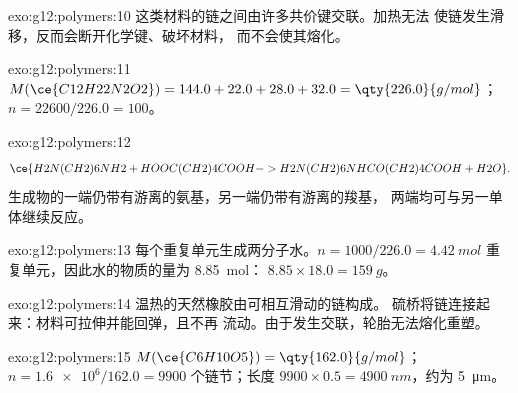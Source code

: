 \begin{solution}{exo:g12:polymers:10}
这类材料的链之间由许多共价键交联。加热无法
使链发生滑移，反而会断开化学键、破坏材料，
而不会使其熔化。
\end{solution}

\begin{solution}{exo:g12:polymers:11}
$M(\ce{C12H22N2O2}) = 144.0 + 22.0 + 28.0 + 32.0 = \qty{226.0}{g/mol}$；
$n = 22600/226.0 = 100$。
\end{solution}

\begin{solution}{exo:g12:polymers:12}
\[
  \ce{H2N(CH2)6NH2 + HOOC(CH2)4COOH -> H2N(CH2)6NHCO(CH2)4COOH + H2O} .
\]
生成物的一端仍带有游离的氨基，另一端仍带有游离的羧基，
两端均可与另一单体继续反应。
\end{solution}

\begin{solution}{exo:g12:polymers:13}
每个重复单元生成两分子水。$n = 1000/226.0 =
\qty{4.42}{mol}$ 重复单元，因此水的物质的量为 \qty{8.85}{mol}：
$8.85 \times 18.0 = \qty{159}{g}$。
\end{solution}

\begin{solution}{exo:g12:polymers:14}
温热的天然橡胶由可相互滑动的链构成。
硫桥将链连接起来：材料可拉伸并能回弹，且不再
流动。由于发生交联，轮胎无法熔化重塑。
\end{solution}

\begin{solution}{exo:g12:polymers:15}
$M(\ce{C6H10O5}) = \qty{162.0}{g/mol}$；$n = \num{1.6e6}/162.0 = 9900$
个链节；长度 $9900 \times 0.5 = \qty{4900}{nm}$，约为
\qty{5}{\micro m}。
\end{solution}

